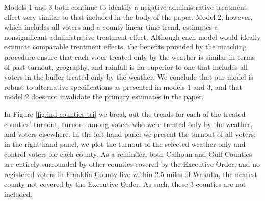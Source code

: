 \documentclass[
  12pt,
]{article}
\begin{document}
\begin{singlespace}

\end{singlespace}

Models 1 and 3 both continue to identify a negative administrative treatment effect very similar to that included in the body of the paper. Model 2, however, which includes all voters and a county-linear time trend, estimates a nonsignificant administrative treatment effect. Although each model would ideally estimate comparable treatment effects, the benefits provided by the matching procedure ensure that each voter treated only by the weather is similar in terms of past turnout, geography, and rainfall is far superior to one that includes all voters in the buffer treated only by the weather. We conclude that our model is robust to alternative specifications as presented in models 1 and 3, and that model 2 does not invalidate the primary estimates in the paper.

In Figure \ref{fig:ind-counties-tri} we break out the trends for each of the treated counties' turnout, turnout among voters who were treated only by the weather, and voters elsewhere. In the left-hand panel we present the turnout of all voters; in the right-hand panel, we plot the turnout of the selected weather-only and control voters for each county. As a reminder, both Calhoun and Gulf Counties are entirely surrounded by other counties covered by the Executive Order, and no registered voters in Franklin County live within 2.5 miles of Wakulla, the nearest county not covered by the Executive Order. As such, these 3 counties are not included.
\end{document}

